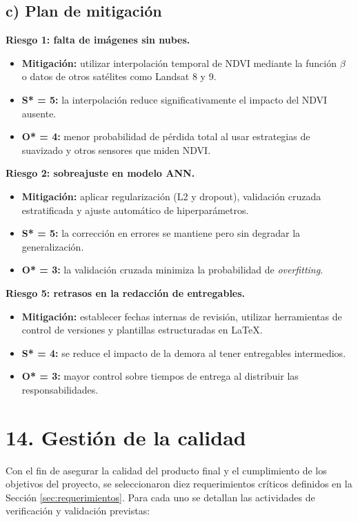 \documentclass[
11pt, %
]{charter}
\begin{document}
\subsection*{c) Plan de mitigación}

\textbf{Riesgo 1: falta de imágenes sin nubes.}
\begin{itemize}
    \item \textbf{Mitigación:} utilizar interpolación temporal de NDVI mediante la función $\beta$ o datos de otros satélites como Landsat 8 y 9. 
    \item \textbf{S* = 5:} la interpolación reduce significativamente el impacto del NDVI ausente.
    \item \textbf{O* = 4:} menor probabilidad de pérdida total al usar estrategias de suavizado y otros sensores que miden NDVI.
\end{itemize}

\textbf{Riesgo 2: sobreajuste en modelo ANN.}
\begin{itemize}
    \item \textbf{Mitigación:} aplicar regularización (L2 y dropout), validación cruzada estratificada y ajuste automático de hiperparámetros.
    \item \textbf{S* = 5:} la corrección en errores se mantiene pero sin degradar la generalización.
    \item \textbf{O* = 3:} la validación cruzada minimiza la probabilidad de \textit{overfitting}.
\end{itemize}

\textbf{Riesgo 5: retrasos en la redacción de entregables.}
\begin{itemize}
    \item \textbf{Mitigación:} establecer fechas internas de revisión, utilizar herramientas de control de versiones y plantillas estructuradas en \LaTeX.
    \item \textbf{S* = 4:} se reduce el impacto de la demora al tener entregables intermedios.
    \item \textbf{O* = 3:} mayor control sobre tiempos de entrega al distribuir las responsabilidades.
\end{itemize}


\section{14. Gestión de la calidad}
\label{sec:calidad}

Con el fin de asegurar la calidad del producto final y el cumplimiento de los objetivos del proyecto, se seleccionaron diez requerimientos críticos definidos en la Sección \ref{sec:requerimientos}. Para cada uno se detallan las actividades de verificación y validación previstas:
\end{document}
